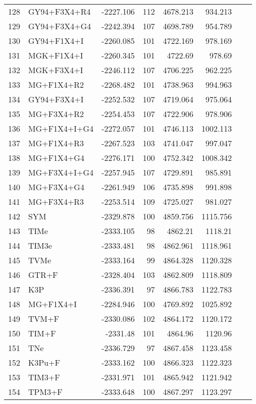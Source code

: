 \begin{longtable}{clrrrrrr}
	128 & GY94+F3X4+R4 & -2227.106 & 112 & 4678.213 & 934.213 \\ 
	129 & GY94+F3X4+G4 & -2242.394 & 107 & 4698.789 & 954.789 \\ 
	130 & GY94+F1X4+I & -2260.085 & 101 & 4722.169 & 978.169 \\ 
	131 & MGK+F1X4+I & -2260.345 & 101 & 4722.69 & 978.69 \\ 
	132 & MGK+F3X4+I & -2246.112 & 107 & 4706.225 & 962.225 \\ 
	133 & MG+F1X4+R2 & -2268.482 & 101 & 4738.963 & 994.963 \\ 
	134 & GY94+F3X4+I & -2252.532 & 107 & 4719.064 & 975.064 \\ 
	135 & MG+F3X4+R2 & -2254.453 & 107 & 4722.906 & 978.906 \\ 
	136 & MG+F1X4+I+G4 & -2272.057 & 101 & 4746.113 & 1002.113 \\ 
	137 & MG+F1X4+R3 & -2267.523 & 103 & 4741.047 & 997.047 \\ 
	138 & MG+F1X4+G4 & -2276.171 & 100 & 4752.342 & 1008.342 \\ 
	139 & MG+F3X4+I+G4 & -2257.945 & 107 & 4729.891 & 985.891 \\ 
	140 & MG+F3X4+G4 & -2261.949 & 106 & 4735.898 & 991.898 \\ 
	141 & MG+F3X4+R3 & -2253.514 & 109 & 4725.027 & 981.027 \\ 
	142 & SYM & -2329.878 & 100 & 4859.756 & 1115.756 \\ 
	143 & TIMe & -2333.105 & 98 & 4862.21 & 1118.21 \\ 
	144 & TIM3e & -2333.481 & 98 & 4862.961 & 1118.961 \\ 
	145 & TVMe & -2333.164 & 99 & 4864.328 & 1120.328 \\ 
	146 & GTR+F & -2328.404 & 103 & 4862.809 & 1118.809 \\ 
	147 & K3P & -2336.391 & 97 & 4866.783 & 1122.783 \\ 
	148 & MG+F1X4+I & -2284.946 & 100 & 4769.892 & 1025.892 \\ 
	149 & TVM+F & -2330.086 & 102 & 4864.172 & 1120.172 \\ 
	150 & TIM+F & -2331.48 & 101 & 4864.96 & 1120.96 \\ 
	151 & TNe & -2336.729 & 97 & 4867.458 & 1123.458 \\ 
	152 & K3Pu+F & -2333.162 & 100 & 4866.323 & 1122.323 \\ 
	153 & TIM3+F & -2331.971 & 101 & 4865.942 & 1121.942 \\ 
	154 & TPM3+F & -2333.648 & 100 & 4867.297 & 1123.297 \\ 

\end{longtable}
